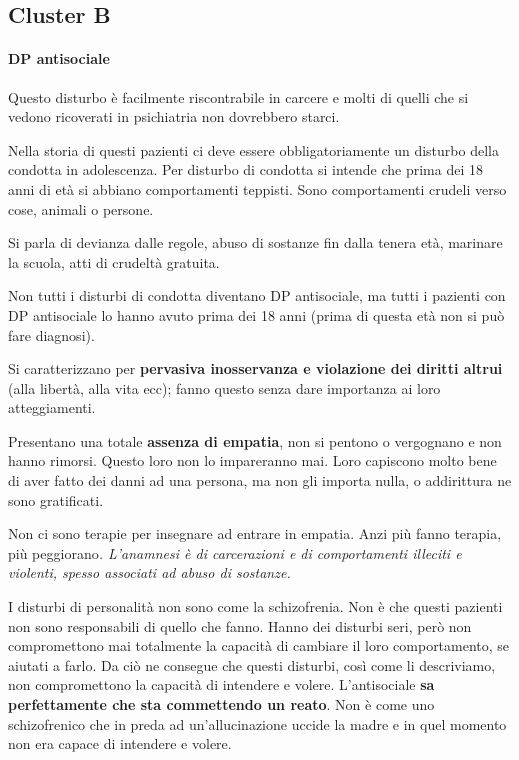 \subsection{Cluster B}

\paragraph{DP antisociale}

Questo disturbo è facilmente riscontrabile in carcere e molti di quelli
che si vedono ricoverati in psichiatria non dovrebbero starci.

Nella storia di questi pazienti ci deve essere obbligatoriamente un
disturbo della condotta in adolescenza. Per disturbo di condotta si
intende che prima dei 18 anni di età si abbiano comportamenti teppisti.
Sono comportamenti crudeli verso cose, animali o persone.

Si parla di devianza dalle regole, abuso di sostanze fin dalla tenera
età, marinare la scuola, atti di crudeltà gratuita.

Non tutti i disturbi di condotta diventano DP antisociale, ma tutti i
pazienti con DP antisociale lo hanno avuto prima dei 18 anni (prima di
questa età non si può fare diagnosi).

Si caratterizzano per \textbf{pervasiva inosservanza e violazione dei
diritti altrui} (alla libertà, alla vita ecc); fanno questo senza dare
importanza ai loro atteggiamenti.

Presentano una totale \textbf{assenza di empatia}, non si pentono o
vergognano e non hanno rimorsi. Questo loro non lo impareranno mai. Loro
capiscono molto bene di aver fatto dei danni ad una persona, ma non gli
importa nulla, o addirittura ne sono gratificati.

Non ci sono terapie per insegnare ad entrare in empatia. Anzi più fanno
terapia, più peggiorano\emph{. \emph{L'anamnesi è di carcerazioni e di
comportamenti illeciti e violenti, spesso associati ad abuso di
sostanze.}}

I disturbi di personalità non sono come la schizofrenia. Non è che
questi pazienti non sono responsabili di quello che fanno. Hanno dei
disturbi seri, però non compromettono mai totalmente la capacità di
cambiare il loro comportamento, se aiutati a farlo. Da ciò ne consegue
che questi disturbi, così come li descriviamo, non compromettono la
capacità di intendere e volere. L'antisociale \textbf{sa perfettamente
che sta commettendo un reato}. Non è come uno schizofrenico che in preda
ad un'allucinazione uccide la madre e in quel momento non era capace di
intendere e volere.

